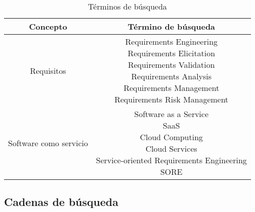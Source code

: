 \documentclass{article}
\begin{document}
\begin{table}[ht]
        \caption{Términos de búsqueda} 
        \centering %
        \begin{tabular}{c c}
                \hline
                Concepto & Término de búsqueda\\ [0.5ex] %
                \hline %
                Requisitos             & \makecell{Requirements Engineering \\
                                                   Requirements Elicitation \\
                                                   Requirements Validation \\
                                                   Requirements Analysis \\
                                                   Requirements Management \\
                                                   Requirements Risk Management} \\ 
                \hline %
                Software como servicio & \makecell{Software as a Service \\
                                                   SaaS \\
                                                   Cloud Computing \\
                                                   Cloud Services\\
                                                   Service-oriented Requirements Engineering \\
                                                   SORE } \\[1ex] 
                \hline 
        \end{tabular}
        \label{table:tablaterminos} %
\end{table}
\newpage

\subsection{Cadenas de búsqueda}
\end{document}
